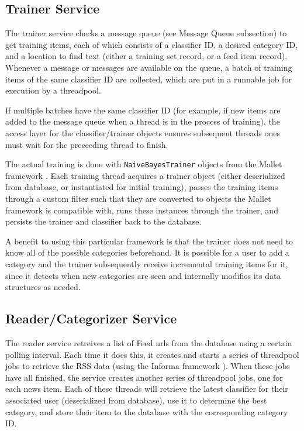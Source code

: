 \documentclass[letterpaper]{article}
\begin{document}
\subsection{Trainer Service}
The trainer service checks a message queue (see Message Queue subsection) to get training items, each of which consists of a classifier ID, a desired category ID, and a location to find text (either a training set record, or a feed item record).
Whenever a message or messages are available on the queue, a batch of training items of the same classifier ID are collected, which are put in a runnable job for execution by a threadpool.

If multiple batches have the same classifier ID (for example, if new items are added to the message queue when a thread is in the process of training), the access layer for the classifier/trainer objects ensures subsequent threads ones must wait for the preceeding thread to finish.

The actual training is done with \texttt{NaiveBayesTrainer} objects from the Mallet framework \cite{McCallumMALLET}.
Each training thread acquires a trainer object (either deserialized from database, or instantiated for initial training),
passes the training items through a custom filter such that they are converted to objects the Mallet framework is compatible with,
runs these instances through the trainer,
and persists the trainer and classifier back to the database.

A benefit to using this particular framework is that the trainer does not need to know all of the possible categories beforehand. It is possible for a user to add a category and the trainer subsequently receive incremental training items for it, since it detects when new categories are seen and internally modifies its data structures as needed.

\subsection{Reader/Categorizer Service}
The reader service retreives a list of Feed urls from the database using a certain polling interval. Each time it does this, it creates and starts a series of threadpool jobs to retrieve the RSS data (using the Informa framework \cite{Informa}). When these jobs have all finished, the service creates another series of threadpool jobs, one for each news item. Each of these threads will retrieve the latest classifier for their associated user (deserialized from database), use it to determine the best category, and store their item to the database with the corresponding category ID.
\end{document}
